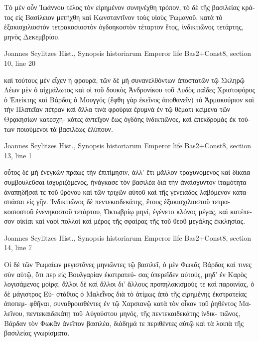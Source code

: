 \documentclass[12pt,letterpaper,twoside,final]{memoir}
\begin{document}
\begin{greek}
Τὸ μὲν οὖν Ἰωάννου τέλος τὸν εἰρημένον συνηνέχθη τρόπον, τὸ 
δὲ τῆς βασιλείας κράτος εἰς Βασίλειον μετήχθη καὶ Κωνσταντῖνον τοὺς 
υἱοὺς Ῥωμανοῦ, κατὰ τὸ ἑξακισχιλιοστὸν τετρακοσιοστὸν ὀγδοηκοστὸν 
τέταρτον ἔτος, ἰνδικτιῶνος τετάρτης, μηνὸς Δεκεμβρίου. 



Joannes Scylitzes Hist., Synopsis historiarum 
Emperor life Bas2+Const8, section 10, line 20

                                                       καὶ τούτους μὲν 
εἶχεν ἡ φρουρά, τῶν δὲ μὴ συνανελθόντων ἀποστατῶν τῷ Σκληρῷ   
Λέων μὲν ὁ αἰχμάλωτος καὶ οἱ τοῦ δουκὸς Ἀνδρονίκου τοῦ Λυδὸς 
παῖδες Χριστοφόρος ὁ Ἐπείκτης καὶ Βάρδας ὁ Μουγγός (ἔφθη γὰρ 
ἐκεῖνος ἀποθανεῖν) τὸ Ἀρμακούριον καὶ τὴν Πλατεῖαν πέτραν καὶ ἄλλα 
τινὰ φρούρια ἐρυμνὰ ἐν τῷ θέματι κείμενα τῶν Θρᾳκησίων κατεσχη-
κότες ἀντεῖχον ἕως ὀγδόης ἰνδικτιῶνος, καὶ ἐπεκδρομὰς ἐκ τούτων 
ποιούμενοι τὰ βασιλέως ἐλύπουν. 



Joannes Scylitzes Hist., Synopsis historiarum 
Emperor life Bas2+Const8, section 13, line 1

                                                                   οὗτος δὲ 
μὴ ἐνεγκὼν πράως τὴν ἐπιτίμησιν, ἀλλ' ἔτι μᾶλλον τραχυνόμενος καὶ 
δίκαια συμβουλεῦσαι ἰσχυριζόμενος, ἠνάγκασε τὸν βασιλέα διὰ τὴν 
ἀναίσχυντον ἰταμότητα ἀναπηδῆσαί τε τοῦ θρόνου καὶ τῶν τριχῶν 
αὐτοῦ καὶ τῆς γενειάδος λαβόμενον κατασπάσαι εἰς γῆν. 
Ἰνδικτιῶνος δὲ πεντεκαιδεκάτης, ἔτους ἑξακισχιλιοστοῦ τετρα-
κοσιοστοῦ ἐνενηκοστοῦ τετάρτου, Ὀκτωβρίῳ μηνί, ἐγένετο κλόνος μέγας,   
καὶ κατέπεσον οἰκίαι καὶ ναοὶ πολλοὶ καὶ μέρος τῆς σφαίρας τῆς τοῦ 
θεοῦ μεγάλης ἐκκλησίας. 



Joannes Scylitzes Hist., Synopsis historiarum 
Emperor life Bas2+Const8, section 14, line 7

Οἱ δὲ τῶν Ῥωμαίων μεγιστᾶνες μηνιῶντες τῷ βασιλεῖ, ὁ μὲν 
Φωκᾶς Βάρδας καί τινες σὺν αὐτῷ, ὅτι περ εἰς Βουλγαρίαν ἐκστρατεύ-
σας ὑπερεῖδεν αὐτούς, μηδ' ἐν Καρὸς λογισάμενος μοίρᾳ, ἄλλοι δὲ καὶ 
ἄλλοι δι' ἄλλους προπηλακισμούς τε καὶ παροινίας, ὁ δὲ μάγιστρος Εὐ-
στάθιος ὁ Μαλεῗνος διὰ τὸ ἀτίμως ἀπὸ τῆς εἰρημένης ἐκστρατείας ἀποπεμ-
φθῆναι, συναθροισθέντες ἐν τῷ Χαρσιανῷ κατὰ τὸν οἶκον τοῦ ῥηθέντος Μα-
λεΐνου, πεντεκαιδεκάτῃ τοῦ Αὐγούστου μηνός, τῆς πεντεκαιδεκάτης ἰνδικ-
τιῶνος, Βάρδαν τὸν Φωκᾶν ἀνεῖπον βασιλέα, διάδημά τε περιθέντες αὐτῷ 
καὶ τὰ λοιπὰ τῆς βασιλείας γνωρίσματα. 




\end{greek}
\end{document}
